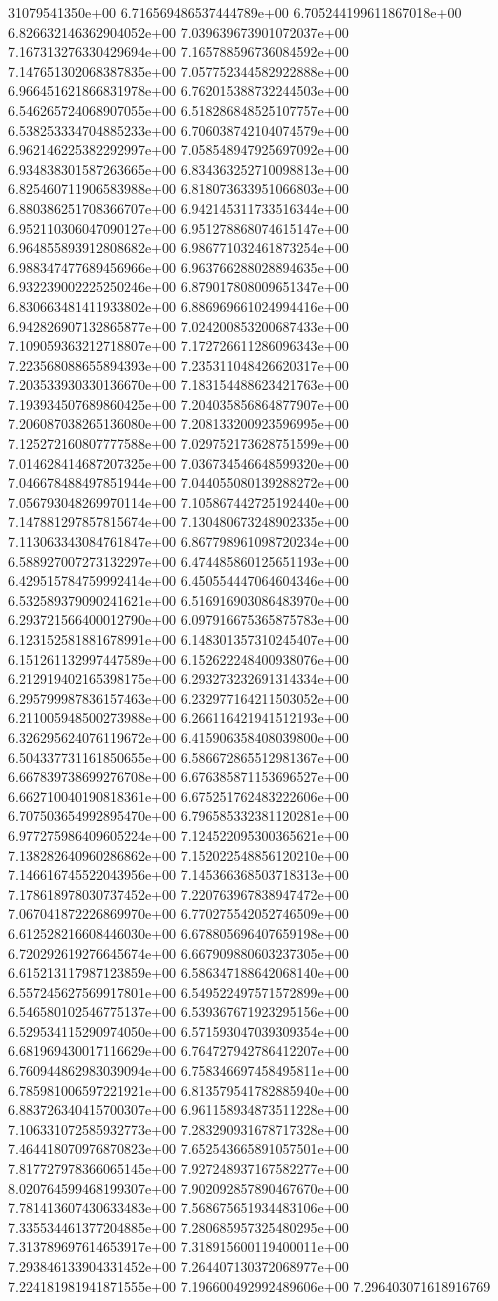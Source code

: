 31079541350e+00	6.716569486537444789e+00	6.705244199611867018e+00	6.826632146362904052e+00	7.039639673901072037e+00	7.167313276330429694e+00	7.165788596736084592e+00	7.147651302068387835e+00	7.057752344582922888e+00	6.966451621866831978e+00	6.762015388732244503e+00	6.546265724068907055e+00	6.518286848525107757e+00	6.538253334704885233e+00	6.706038742104074579e+00	6.962146225382292997e+00	7.058548947925697092e+00	6.934838301587263665e+00	6.834363252710098813e+00	6.825460711906583988e+00	6.818073633951066803e+00	6.880386251708366707e+00	6.942145311733516344e+00	6.952110306047090127e+00	6.951278868074615147e+00	6.964855893912808682e+00	6.986771032461873254e+00	6.988347477689456966e+00	6.963766288028894635e+00	6.932239002225250246e+00	6.879017808009651347e+00	6.830663481411933802e+00	6.886969661024994416e+00	6.942826907132865877e+00	7.024200853200687433e+00	7.109059363212718807e+00	7.172726611286096343e+00	7.223568088655894393e+00	7.235311048426620317e+00	7.203533930330136670e+00	7.183154488623421763e+00	7.193934507689860425e+00	7.204035856864877907e+00	7.206087038265136080e+00	7.208133200923596995e+00	7.125272160807777588e+00	7.029752173628751599e+00	7.014628414687207325e+00	7.036734546648599320e+00	7.046678488497851944e+00	7.044055080139288272e+00	7.056793048269970114e+00	7.105867442725192440e+00	7.147881297857815674e+00	7.130480673248902335e+00	7.113063343084761847e+00	6.867798961098720234e+00	6.588927007273132297e+00	6.474485860125651193e+00	6.429515784759992414e+00	6.450554447064604346e+00	6.532589379090241621e+00	6.516916903086483970e+00	6.293721566400012790e+00	6.097916675365875783e+00	6.123152581881678991e+00	6.148301357310245407e+00	6.151261132997447589e+00	6.152622248400938076e+00	6.212919402165398175e+00	6.293273232691314334e+00	6.295799987836157463e+00	6.232977164211503052e+00	6.211005948500273988e+00	6.266116421941512193e+00	6.326295624076119672e+00	6.415906358408039800e+00	6.504337731161850655e+00	6.586672865512981367e+00	6.667839738699276708e+00	6.676385871153696527e+00	6.662710040190818361e+00	6.675251762483222606e+00	6.707503654992895470e+00	6.796585332381120281e+00	6.977275986409605224e+00	7.124522095300365621e+00	7.138282640960286862e+00	7.152022548856120210e+00	7.146616745522043956e+00	7.145366368503718313e+00	7.178618978030737452e+00	7.220763967838947472e+00	7.067041872226869970e+00	6.770275542052746509e+00	6.612528216608446030e+00	6.678805696407659198e+00	6.720292619276645674e+00	6.667909880603237305e+00	6.615213117987123859e+00	6.586347188642068140e+00	6.557245627569917801e+00	6.549522497571572899e+00	6.546580102546775137e+00	6.539367671923295156e+00	6.529534115290974050e+00	6.571593047039309354e+00	6.681969430017116629e+00	6.764727942786412207e+00	6.760944862983039094e+00	6.758346697458495811e+00	6.785981006597221921e+00	6.813579541782885940e+00	6.883726340415700307e+00	6.961158934873511228e+00	7.106331072585932773e+00	7.283290931678717328e+00	7.464418070976870823e+00	7.652543665891057501e+00	7.817727978366065145e+00	7.927248937167582277e+00	8.020764599468199307e+00	7.902092857890467670e+00	7.781413607430633483e+00	7.568675651934483106e+00	7.335534461377204885e+00	7.280685957325480295e+00	7.313789697614653917e+00	7.318915600119400011e+00	7.293846133904331452e+00	7.264407130372068977e+00	7.224181981941871555e+00	7.196600492992489606e+00	7.296403071618916769